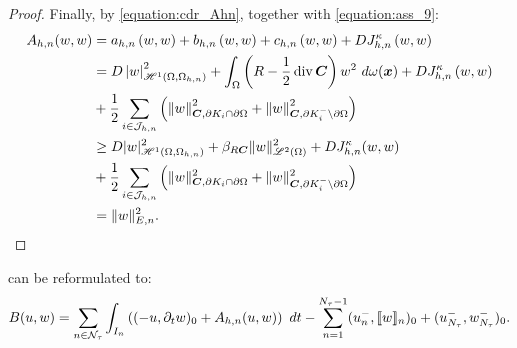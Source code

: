 \begin{proof}
    Finally, by \cref{equation:cdr_Ahn}, together with \cref{equation:ass_9}:
    \begin{align*}
        A_{h, n}(w, w) &= a_{h, n} \left( w, w \right) + b_{h, n} \left( w, w \right) + c_{h, n} \left( w, w \right) + D J^{\kappa}_{h, n} \left( w, w \right) \\
        &= D \left\lvert w \right\rvert_{\mathscr{H}^{1}(\Omega, \Omega_{h, n})}^2 + \int_{\Omega} \left( R - \frac12 \operatorname*{div}{\bm{C}} \right) w^2 ~ d \omega(\bm{x}) + D J^{\kappa}_{h, n} \left( w, w \right) \\
        &+ \frac12 \sum_{i \in \mathcal{J}_{h, n}} \left( \left\lVert  w  \right\rVert_{\bm{C}, \partial K_i \cap \partial \Omega}^2 + \left\lVert  w  \right\rVert_{\bm{C}, \partial K_i^- \setminus \partial \Omega}^2 \right) \\
        &\geq D \lvert w \rvert_{\mathscr{H}^{1}(\Omega, \Omega_{h, n})}^2 + \beta_{R \bm{C}} \lVert w \rVert_{\mathscr{L}^{2}(\Omega)}^2 + D J^{\kappa}_{h, n}(w, w) \\
        &+ \frac{1}{2} \sum_{i \in \mathcal{J}_{h, n}} \left( \lVert w \rVert_{\bm{C}, \partial K_i \cap \partial \Omega}^2 + \lVert w \rVert_{\bm{C}, \partial K_i^- \setminus \partial \Omega}^2 \right) \\
        &= \lVert w \rVert_{E, n}^2.
    \end{align*}
\end{proof}

\begin{lemma}[Reformulation of $B$]
     can be reformulated to:
    \begin{align}
        B(u, w) = \sum_{n \in \mathcal{N}_{\tau}} \int_{I_n} \left( (-u, \partial_t w )_0 + A_{h, n}(u, w) \right) ~ dt - \sum_{n = 1}^{N_{\tau} - 1} (u_n^-, \llbracket w \rrbracket_n )_0 + (u_{N_{\tau}}^-, w_{N_{\tau}}^-)_0. \label{equation:cdr_B_reformulated}
    \end{align}
\end{lemma}


